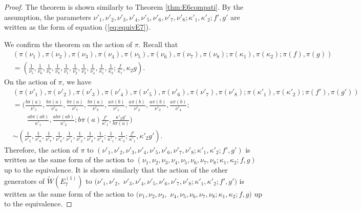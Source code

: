 \documentclass[12pt]{amsart}
\numberwithin{equation}{section}
\theoremstyle{definition}
\begin{document}
\begin{proof}
The theorem is shown similarly to Theorem \ref{thm:E6compati}.
By the assumption, the parameters $ \nu '_1 , \nu '_2 , \nu '_3 , \nu '_4 ,\nu '_5 ,\nu '_6 , \nu '_7 ,\nu '_8 ; \kappa '_1 ,\kappa '_2 ; f' ,g' $ are written as the form of equation (\ref{eq:equivE7}).

We confirm the theorem on the action of $\pi $.
Recall that
\begin{align}
  & ( \pi(\nu_1), \pi(\nu_2), \pi(\nu_3), \pi(\nu_4), \pi(\nu_5), \pi(\nu_6), \pi(\nu_7), \pi(\nu_8); \pi(\kappa_1), \pi(\kappa_2); \pi(f), \pi(g) )\\
  & = ( \frac{1}{\nu_5}, \frac{1}{\nu_6}, \frac{1}{\nu_7}, \frac{1}{\nu_8}, \frac{1}{\nu_1}, \frac{1}{\nu_2}, \frac{1}{\nu_3}, \frac{1}{\nu_4}, \frac{1}{\kappa_1}, \frac{1}{\kappa_2}; \frac{f}{\kappa_1 }, \kappa_2 g ). \nonumber
\end{align}
On the action of $\pi $, we have
\begin{align}
  & ( \pi(\nu'_1), \pi(\nu'_2), \pi(\nu'_3), \pi(\nu'_4), \pi(\nu'_5), \pi(\nu'_6), \pi(\nu'_7), \pi(\nu'_8);\pi(\kappa'_1), \pi(\kappa'_2); \pi(f'), \pi(g') )\\
  & = ( \frac{b \pi(a)}{\nu'_5}, \frac{b \pi(a) }{\nu'_6}, \frac{b \pi(a) }{\nu'_7}, \frac{b \pi(a) }{\nu'_8}, \frac{a \pi(b)}{\nu'_1}, \frac{a \pi(b)}{\nu'_2}, \frac{a \pi(b)}{\nu'_3}, \frac{a \pi(b)}{\nu'_4}; \nonumber \\
  &  \qquad \frac{ab \pi(ab) }{\kappa'_1}, \frac{ab \pi(ab) }{\kappa'_2}; b \pi(a)\frac{ f'}{\kappa'_1},  \frac{\kappa'_2 g' }{b \pi(a)} ) \nonumber \\
  & \sim ( \frac{1}{\nu'_5}, \frac{1}{\nu'_6}, \frac{1}{\nu'_7}, \frac{1}{\nu'_8}, \frac{1}{\nu'_1}, \frac{1}{\nu'_2}, \frac{1}{\nu'_3}, \frac{1}{\nu'_4}; \frac{1}{\kappa'_1}, \frac{1}{\kappa'_2} ; \frac{f'}{\kappa'_1} , \kappa'_2 g' ). \nonumber 
\end{align}
Therefore, the action of $\pi $ to $(\nu '_1 , \nu '_2 , \nu '_3 , \nu '_4 ,\nu '_5 ,\nu '_6 , \nu '_7 ,\nu '_8 ; \kappa '_1 ,\kappa '_2 ; f' ,g' ) $ is written as the same form of the action to $(\nu _1 , \nu _2 , \nu _3 , \nu _4 ,\nu _5 ,\nu _6 , \nu _7 ,\nu _8 ; \kappa _1 ,\kappa _2 ; f ,g ) $ up to the equivalence.
It is shown similarly that the action of the other generators of $\widetilde{W}(E^{(1)}_{7})$ to $(\nu '_1 , \nu '_2 ,$ $ \nu '_3 , \nu '_4 ,\nu '_5 ,\nu '_6 , \nu '_7 ,\nu '_8 ; \kappa '_1 ,\kappa '_2 ; f' ,g' ) $ is written as the same form of the action to $(\nu _1 , \nu _2 , \nu _3 ,$ $ \nu _4 ,\nu _5 ,\nu _6 , \nu _7 ,\nu _8 ; \kappa _1 ,\kappa _2 ; f ,g ) $ up to the equivalence.

\end{proof}
\end{document}
